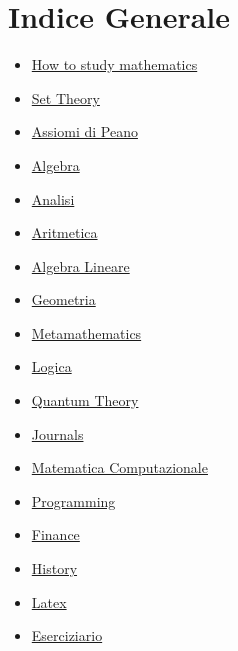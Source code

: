 \documentclass[a4paper,10pt]{article}
\begin{document}
\section{Indice Generale}
\begin{itemize}
  \item \href{HowToStudy.html}{How to study mathematics}
  \item \href{SetTheory.html}{Set Theory}
  \item \href{AssiomiPeano.html}{Assiomi di Peano}
  \item \href{Algebra.html}{Algebra} 
  \item \href{Analisi.html}{Analisi} 
  \item \href{Aritmetica.html}{Aritmetica}
  \item \href{AlgebraLineare.html}{Algebra Lineare}
  \item \href{Geometria.html}{Geometria}
  \item \href{Metamathematics.html}{Metamathematics}
  \item \href{Logics.html}{Logica}
  \item \href{QuantumTheory.html}{Quantum Theory}
  \item \href{Journals.html}{Journals}
  \item \href{MatematicaComputazionale.html}{Matematica Computazionale}
  \item \href{Programming.html}{Programming}
  \item \href{Finance.html}{Finance} 
  \item \href{history.html}{History} 
  \item \href{latex.html}{Latex} 
  \item \href{Eserciziario.html}{Eserciziario}
  
\end{itemize}
\end{document}
